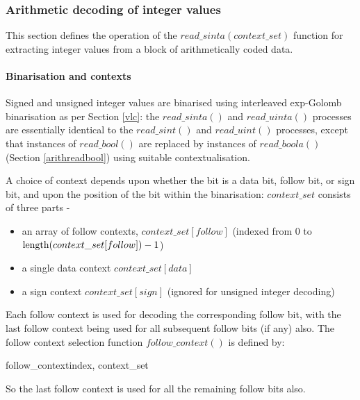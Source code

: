 \subsubsection{Arithmetic decoding of integer values}

\label{arithreadint}

This section defines the operation of the $read\_sinta(context\_set)$ function
 for extracting integer values from a block of arithmetically coded data.

\paragraph{Binarisation and contexts \\}

Signed and unsigned integer values are binarised using interleaved exp-Golomb
 binarisation as per Section \ref{vlc}: the $read\_sinta()$ and $read\_uinta()$
processes are essentially identical to the 
$read\_sint()$ and $read\_uint()$ processes, except that instances of $read\_bool()$ are replaced
by instances of $read\_boola()$ (Section \ref{arithreadbool}) using suitable contextualisation. 

A choice of context depends upon whether the bit is a data bit, follow bit, or sign bit, and upon the 
position of the bit within the binarisation: $context\_set$ consists of three parts -
\begin{itemize}
\item an array of follow contexts, $context\_set[follow]$ (indexed from 0 to 
$\operatorname{length}(context\_set[follow])-1$)
\item a single data context $context\_set[data]$ 
\item a sign context $context\_set[sign]$ (ignored for unsigned integer decoding)
\end{itemize}

Each follow context is used for decoding the corresponding follow bit, with the
last follow context being used for all subsequent follow bits (if any) also. 
The follow context selection function $follow\_context()$ is defined by:

\begin{pseudo}{follow\_context}{index, context\_set}
\end{pseudo}

So the last follow context is used for all the remaining follow bits also.

